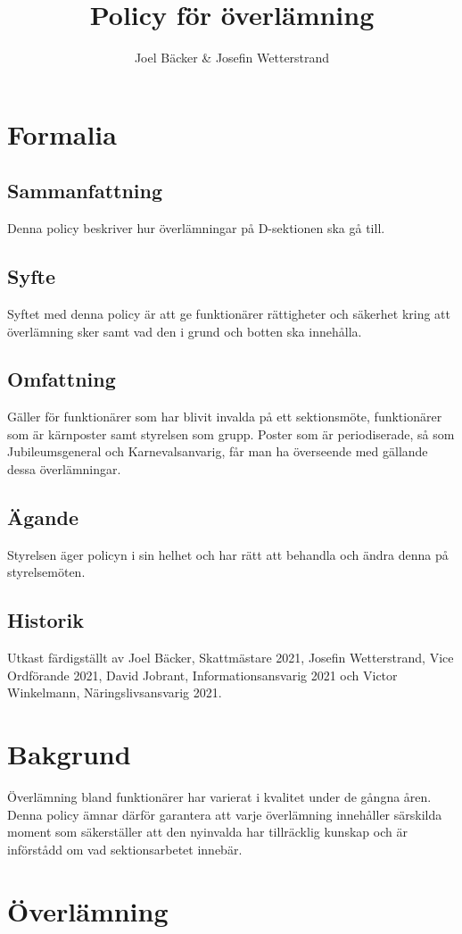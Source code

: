 \documentclass[]{dsekkallelse}
\title{Policy för överlämning}
\author{Joel Bäcker \& Josefin Wetterstrand}
\begin{document}
\section{Formalia}
\subsection{Sammanfattning}
Denna policy beskriver hur överlämningar på D-sektionen ska gå till.

\subsection{Syfte}
Syftet med denna policy är att ge funktionärer rättigheter och säkerhet kring att överlämning sker samt vad den i grund och botten ska innehålla.

\subsection{Omfattning} %
Gäller för funktionärer som har blivit invalda på ett sektionsmöte, funktionärer som är kärnposter samt styrelsen som grupp. Poster som är periodiserade, så som Jubileumsgeneral och Karnevalsanvarig, får man ha överseende med gällande dessa överlämningar.

\subsection{Ägande}
Styrelsen äger policyn i sin helhet och har rätt att behandla och ändra denna på styrelsemöten.

\subsection{Historik}
Utkast färdigställt av Joel Bäcker, Skattmästare 2021, Josefin Wetterstrand, Vice Ordförande 2021, David Jobrant, Informationsansvarig 2021 och Victor Winkelmann, Näringslivsansvarig 2021.

\section{Bakgrund}
Överlämning bland funktionärer har varierat i kvalitet under de gångna åren. Denna policy ämnar därför garantera att varje överlämning innehåller särskilda moment som säkerställer att den nyinvalda har tillräcklig kunskap och är införstådd om vad sektionsarbetet innebär.

\section{Överlämning}
\end{document}
